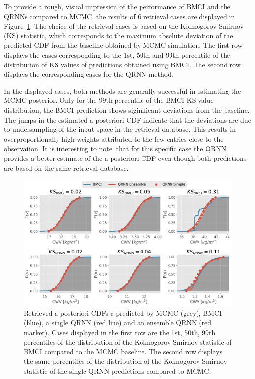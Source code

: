 \documentclass[journal abbreviation, manuscript]{copernicus}
\begin{document}
  To provide a rough, visual impression of the performance of BMCI and the QRNNs
  compared to MCMC, the results of 6 retrieval cases are displayed in
  Figure~\ref{fig:cdfs}. The choice of the retrieval cases is based on the
  Kolmogorov-Smirnov (KS) statistic, which corresponds to the maximum absolute
  deviation of the predicted CDF from the baseline obtained by MCMC
  simulation. The first row displays the cases corresponding to the 1st, 50th
  and 99th percentile of the distribution of KS values of predictions obtained
  using BMCI. The second row displays the corresponding cases for the QRNN
  method.

  In the displayed cases, both methods are generally successful in estimating the
  MCMC posterior. Only for the $99$th percentile of the BMCI KS value distribution,
  the BMCI prediction shows siginificant deviations from the baseline. The jumps
  in the estimated a posteriori CDF  indicate that the deviations are due to
  undersampling of the input space in the retrieval database. This results in 
  overproportionally high weights attributed to the few entries close to the
  observation. It is interesting to note, that for this specific case the QRNN
  provides a better estimate of the a posteriori CDF even though both
  predictions are based on the same retrieval database.

  \begin{figure}[hbpt!]
    \centering
    \includegraphics[width = 0.8\linewidth]{../plots/posterior_cdfs}
    \caption{Retrieved a posteriori CDFs a predicted by MCMC (grey), BMCI (blue),
      a single QRNN (red line) and an ensemble QRNN (red marker). Cases displayed in the first
      row are the 1st, 50th, 99th percentiles of the distribution of the Kolmogorov-Smirnov
      statistic of BMCI compared to the MCMC baseline. The second row displays the
      same percentiles of the distribution of the Kolmogorov-Smirnov statistic of the
      single QRNN predictions compared to MCMC.}
    \label{fig:cdfs}
  \end{figure}
\end{document}
